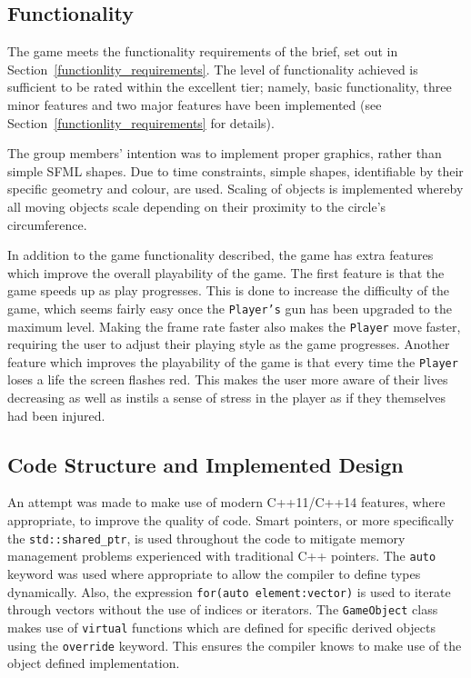 \documentclass[10pt,twocolumn]{witseiepaper}
\begin{document}
\subsection{Functionality}

The game meets the functionality requirements of the brief, set out in Section~\ref{functionlity_requirements}. The level of functionality achieved is sufficient to be rated within the excellent tier; namely, basic functionality, three minor features and two major features have been implemented (see Section~\ref{functionlity_requirements} for details). 

The group members' intention was to implement proper graphics, rather than simple SFML shapes. Due to time constraints, simple shapes, identifiable by their specific geometry and colour, are used. Scaling of objects is implemented whereby all moving objects scale depending on their proximity to the circle's circumference.

In addition to the game functionality described, the game has extra features which improve the overall playability of the game. The first feature is that the game speeds up as play progresses. This is done to increase the difficulty of the game, which seems fairly easy once the \texttt{Player's} gun has been upgraded to the maximum level. Making the frame rate faster also makes the \texttt{Player} move faster, requiring the user to adjust their playing style as the game progresses. Another feature which improves the playability of the game is that every time the \texttt{Player} loses a life the screen flashes red. This makes the user more aware of their lives decreasing as well as instils a sense of stress in the player as if they themselves had been injured. 

\subsection{Code Structure and Implemented Design}\label{critical_code_structure}

An attempt was made to make use of modern  C++11/C++14 features, where appropriate, to improve the quality of code. Smart pointers, or more specifically the \texttt{std::shared\_ptr}, is used throughout the code to mitigate memory management problems experienced with traditional C++ pointers.  The \texttt{auto} keyword was used where appropriate to allow the compiler to define types dynamically. Also, the expression \texttt{for(auto element:vector)} is used to iterate through vectors without the use of indices or iterators. The \texttt{GameObject} class makes use of \texttt{virtual} functions which are defined for specific derived objects using the \texttt{override} keyword. This ensures the compiler knows to make use of the object defined implementation.
\end{document}
